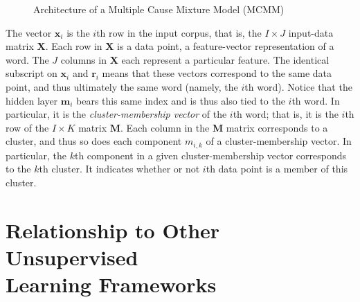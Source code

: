\begin{figure}[t]
\begin{mdframed}
\caption{Architecture of a Multiple Cause Mixture Model (MCMM)} 
\label{fig:mcmm}
\vspace{12pt}
\end{mdframed}
\end{figure}

The vector $\mathbf{x}_i$ is the $i$th row in the 
input corpus, that is, the $I \times J$ input-data matrix $\textbf{X}$. Each 
row in $\textbf{X}$ is a data point, a feature-vector representation of a word. 
The $J$ columns in  $\textbf{X}$ each represent a particular feature.
The identical subscript on $\mathbf{x}_i$ 
and $\mathbf{r}_i$ means that these vectors correspond to the same data 
point, and thus ultimately the same word (namely, the $i$th word). Notice that the hidden 
layer $\textbf{m}_i$ bears this same index and is thus also tied to the $i$th word. In particular, it 
is the 
\emph{cluster-membership vector} of the $i$th word; that is, it is the $i$th row of 
the $I \times K$ matrix 
$\mathbf{M}$.  Each column in the $\mathbf{M}$ matrix corresponds to a cluster, and thus so does each component $m_{i,k}$ of a cluster-membership vector. In particular, the $k$th component in a given cluster-membership vector corresponds to the $k$th cluster. It indicates whether or not $i$th data point is a member of this cluster. 

\section{Relationship to Other Unsupervised\\Learning Frameworks}
\label{sec:context}


